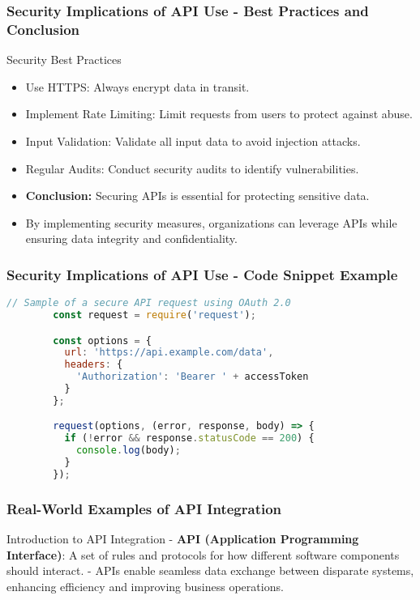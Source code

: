 \documentclass[aspectratio=169]{beamer}
\begin{document}
\begin{frame}[fragile]
    \frametitle{Security Implications of API Use - Best Practices and Conclusion}
    \begin{block}{Security Best Practices}
        \begin{itemize}
            \item Use HTTPS: Always encrypt data in transit.
            \item Implement Rate Limiting: Limit requests from users to protect against abuse.
            \item Input Validation: Validate all input data to avoid injection attacks.
            \item Regular Audits: Conduct security audits to identify vulnerabilities.
        \end{itemize}
    \end{block}

    \begin{itemize}
        \item \textbf{Conclusion:} Securing APIs is essential for protecting sensitive data.
        \item By implementing security measures, organizations can leverage APIs while ensuring data integrity and confidentiality.
    \end{itemize}
\end{frame}

\begin{frame}[fragile]
    \frametitle{Security Implications of API Use - Code Snippet Example}
    \begin{lstlisting}[language=JavaScript, keywordstyle=\color{blue}, commentstyle=\color{green}, stringstyle=\color{red}]
        // Sample of a secure API request using OAuth 2.0
        const request = require('request');

        const options = {
          url: 'https://api.example.com/data',
          headers: {
            'Authorization': 'Bearer ' + accessToken
          }
        };

        request(options, (error, response, body) => {
          if (!error && response.statusCode == 200) {
            console.log(body);
          }
        });
    \end{lstlisting}
\end{frame}

\begin{frame}[fragile]
    \frametitle{Real-World Examples of API Integration}
    \begin{block}{Introduction to API Integration}
        - \textbf{API (Application Programming Interface)}: A set of rules and protocols for how different software components should interact. 
        - APIs enable seamless data exchange between disparate systems, enhancing efficiency and improving business operations.
    \end{block}
\end{frame}
\end{document}
